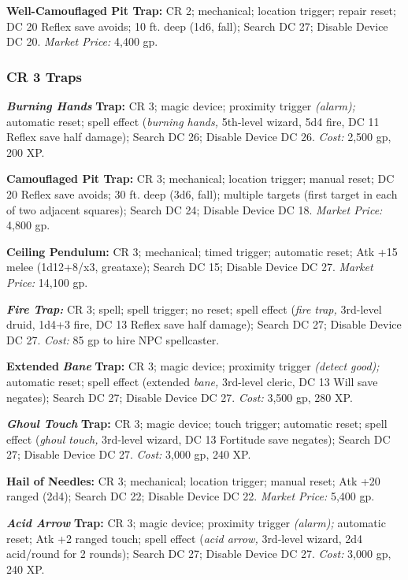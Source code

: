 \documentclass{article}
\begin{document}
\textbf{Well-Camouflaged Pit Trap: }CR 2; mechanical; location trigger; repair 
reset; DC 20 Reflex save avoids; 10 ft. deep (1d6, fall); Search DC 27; Disable 
Device DC 20. \textit{Market Price: }4,400 gp.

\vspace{12pt}
\subsubsection*{\textbf{CR 3 Traps}}

\textit{\textbf{Burning Hands }}\textbf{Trap: }CR 3; magic device; proximity trigger 
\textit{(alarm); }automatic reset; spell effect (\textit{burning hands, }5th-level 
wizard, 5d4 fire, DC 11 Reflex save half damage); Search DC 26; Disable Device 
DC 26. \textit{Cost: }2,500 gp, 200 XP.

\textbf{Camouflaged Pit Trap: }CR 3; mechanical; location trigger; manual reset; 
DC 20 Reflex save avoids; 30 ft. deep (3d6, fall); multiple targets (first target 
in each of two adjacent squares); Search DC 24; Disable Device DC 18. \textit{Market 
Price: }4,800 gp.

\textbf{Ceiling Pendulum: }CR 3; mechanical; timed trigger; automatic reset; Atk 
+15 melee (1d12+8/x3, greataxe); Search DC 15; Disable Device DC 27. \textit{Market 
Price: }14,100 gp.

\textit{\textbf{Fire Trap:}}\textit{ }CR 3; spell; spell trigger; no reset; spell 
effect (\textit{fire trap, }3rd-level druid, 1d4+3 fire, DC 13 Reflex save half 
damage); Search DC 27; Disable Device DC 27. \textit{Cost: }85 gp to hire NPC spellcaster.

\textbf{Extended }\textit{\textbf{Bane }}\textbf{Trap: }CR 3; magic device; proximity 
trigger \textit{(detect good); }automatic reset; spell effect (extended \textit{bane, 
}3rd-level cleric, DC 13 Will save negates); Search DC 27; Disable Device DC 27. 
\textit{Cost: }3,500 gp, 280 XP.

\textit{\textbf{Ghoul Touch }}\textbf{Trap: }CR 3; magic device; touch trigger; 
automatic reset; spell effect (\textit{ghoul touch, }3rd-level wizard, DC 13 Fortitude 
save negates); Search DC 27; Disable Device DC 27. \textit{Cost: }3,000 gp, 240 
XP. 

\textbf{Hail of Needles: }CR 3; mechanical; location trigger; manual reset; Atk 
+20 ranged (2d4); Search DC 22; Disable Device DC 22. \textit{Market Price: }5,400 
gp.

\textit{\textbf{Acid Arrow }}\textbf{Trap:} CR 3; magic device; proximity trigger 
\textit{(alarm); }automatic reset; Atk +2 ranged touch; spell effect (\textit{acid 
arrow, }3rd-level wizard, 2d4 acid/round for 2 rounds); Search DC 27; Disable Device 
DC 27. \textit{Cost: }3,000 gp, 240 XP.
\end{document}
